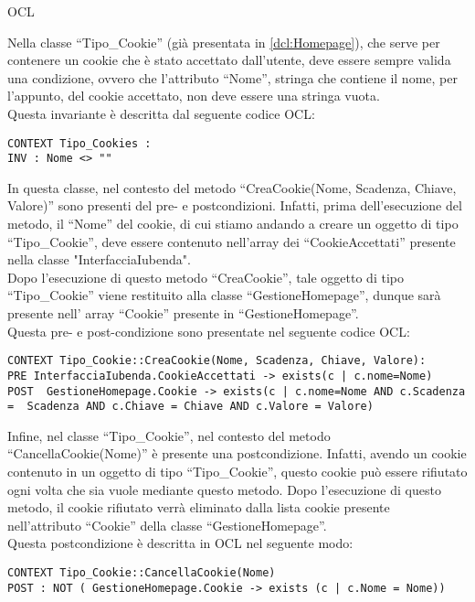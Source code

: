 \begin{listaPersonale}{OCL}
        \begin{center}
            
        \end{center}
        Nella classe “Tipo\_Cookie” (già presentata in \ref{dcl:Homepage}), che serve per contenere un cookie che è stato accettato dall'utente, deve essere sempre valida una condizione, ovvero che l'attributo “Nome”, stringa che contiene il nome, per l'appunto, del cookie accettato, non deve essere una stringa vuota.\\
        Questa invariante è descritta dal seguente codice OCL:
        \begin{lstlisting}
CONTEXT Tipo_Cookies :
INV : Nome <> "" 
    \end{lstlisting}
        In questa classe, nel contesto del metodo “CreaCookie(Nome, Scadenza, Chiave, Valore)” sono presenti del pre- e postcondizioni. Infatti, prima dell'esecuzione del metodo, il “Nome” del cookie, di cui stiamo andando a creare un oggetto di tipo “Tipo\_Cookie”, deve essere contenuto nell'array dei “CookieAccettati” presente nella classe "InterfacciaIubenda".\\
        Dopo l'esecuzione di questo metodo “CreaCookie”, tale oggetto di tipo “Tipo\_Cookie” viene restituito alla classe “GestioneHomepage”, dunque sarà presente nell' array “Cookie” presente in “GestioneHomepage”.\\
        Questa pre- e post-condizione sono presentate nel seguente codice OCL:
        \begin{lstlisting}
CONTEXT Tipo_Cookie::CreaCookie(Nome, Scadenza, Chiave, Valore):
PRE InterfacciaIubenda.CookieAccettati -> exists(c | c.nome=Nome)
POST  GestioneHomepage.Cookie -> exists(c | c.nome=Nome AND c.Scadenza =  Scadenza AND c.Chiave = Chiave AND c.Valore = Valore) 
    \end{lstlisting}
        Infine, nel classe “Tipo\_Cookie”, nel contesto del metodo “CancellaCookie(Nome)” è presente una postcondizione. Infatti, avendo un cookie contenuto in un oggetto di tipo “Tipo\_Cookie”, questo cookie può essere rifiutato ogni volta che sia vuole mediante questo metodo. Dopo l'esecuzione di questo metodo, il cookie rifiutato verrà eliminato dalla lista cookie presente nell'attributo “Cookie” della classe “GestioneHomepage”.\\
        Questa postcondizione è descritta in OCL nel seguente modo:

        \begin{lstlisting}
CONTEXT Tipo_Cookie::CancellaCookie(Nome)
POST : NOT ( GestioneHomepage.Cookie -> exists (c | c.Nome = Nome))
    \end{lstlisting}


\end{listaPersonale}
